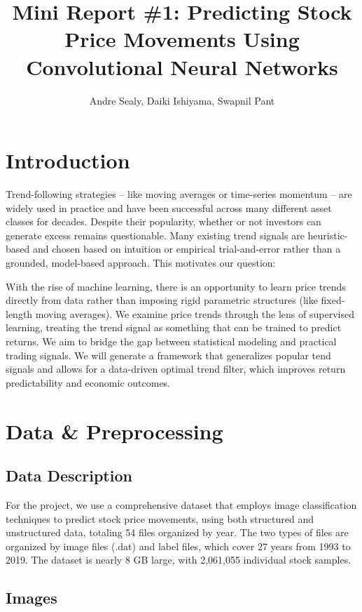\documentclass[12pt]{article}
\title{Mini Report \#1: Predicting Stock Price Movements Using Convolutional Neural Networks}
\author{Andre Sealy, Daiki Ishiyama, Swapnil Pant}
\begin{document}
	
\maketitle

\section*{Introduction}

Trend-following strategies -- like moving averages or time-series momentum -- are widely used in practice and have been successful across many different asset classes for decades. Despite their popularity, whether or not investors can generate excess remains questionable. Many existing trend signals are heuristic-based and chosen based on intuition or empirical trial-and-error rather than a grounded, model-based approach. This motivates our question: 

With the rise of machine learning, there is an opportunity to learn price trends directly from data rather than imposing rigid parametric structures (like fixed-length moving averages). We examine price trends through the lens of supervised learning, treating the trend signal as something that can be trained to predict returns. We aim to bridge the gap between statistical modeling and practical trading signals. We will generate a framework that generalizes popular tend signals and allows for a data-driven optimal trend filter, which improves return predictability and economic outcomes.

\section*{Data \& Preprocessing}
\subsection*{Data Description}

For the project, we use a comprehensive dataset that employs image classification techniques to predict stock price movements, using both structured and unstructured data, totaling 54 files organized by year. The two types of files are organized by image files (.dat) and label files, which cover 27 years from 1993 to 2019. The dataset is nearly 8 GB large, with 2,061,055 individual stock samples.

\subsection*{Images}
\end{document}
